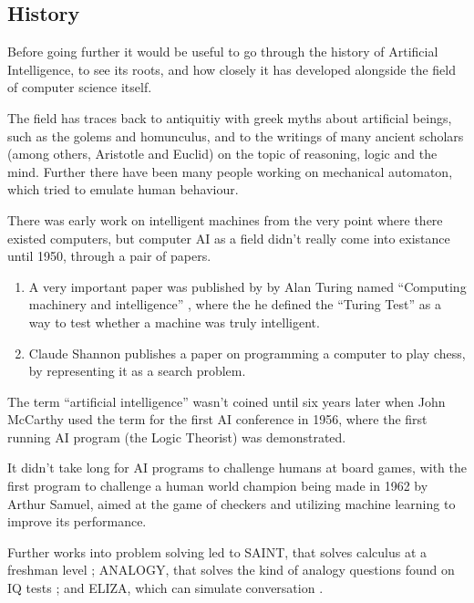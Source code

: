 \documentclass[]{report}
\begin{document}
\subsection{History}
\label{sec:trad-ai-history}

Before going further it would be useful to go through the history of Artificial
Intelligence, to see its roots, and how closely it has developed alongside the
field of computer science itself. \citep{luger2005artificial,buchanan2002brief}

The field has traces back to antiquitiy with greek myths about artificial
beings, such as the golems and homunculus, and to the writings of many ancient
scholars (among others, Aristotle and Euclid) on the topic of reasoning, logic
and the mind. Further there have been many people working on mechanical
automaton, which tried to emulate human behaviour.

There was early work on intelligent machines from the very point where there
existed computers, but computer AI as a field didn't really come into existance
until 1950, through a pair of papers.

\begin{enumerate}
\item A very important paper was published by by Alan Turing named ``Computing
  machinery and intelligence'' \citep{turing1950computing}, where the he defined
  the ``Turing Test'' as a way to test whether a machine was truly intelligent.
\item Claude Shannon publishes a paper on programming a computer to play chess,
  by representing it as a search problem. \citep{shannon1950programming}
\end{enumerate}

The term ``artificial intelligence'' wasn't coined until six years later when
John McCarthy used the term for the first AI conference in 1956, where the first
running AI program (the Logic Theorist) was demonstrated.

It didn't take long for AI programs to challenge humans at board games, with the
first program to challenge a human world champion being made in 1962 by Arthur
Samuel, aimed at the game of checkers and utilizing machine learning to improve
its performance.

Further works into problem solving led to SAINT, that solves calculus at a
freshman level \citep{slagle1963heuristic}; ANALOGY, that solves the kind of
analogy questions found on IQ tests \citet{evans1964program}; and ELIZA, which
can simulate conversation \citep{weizenbaum1966eliza}.
\end{document}

